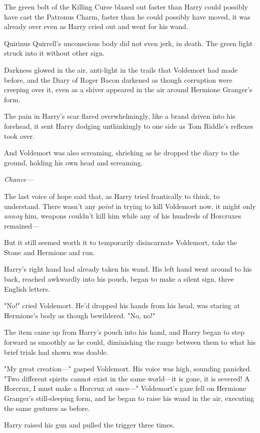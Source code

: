 The green bolt of the Killing Curse blazed out faster than Harry could possibly
have cast the Patronus Charm, faster than he could possibly have moved, it was
already over even as Harry cried out and went for his wand.

Quirinus Quirrell's unconscious body did not even jerk, in death. The green
light struck into it without other sign.

Darkness glowed in the air, anti-light in the trails that Voldemort had made
before, and the Diary of Roger Bacon darkened as though corruption were
creeping over it, even as a shiver appeared in the air around Hermione
Granger's form.

The pain in Harry's scar flared overwhelmingly, like a brand driven into his
forehead, it sent Harry dodging unthinkingly to one side as Tom Riddle's
reflexes took over.

And Voldemort was also screaming, shrieking as he dropped the diary to the
ground, holding his own head and screaming.

\emph{Chance---}

The last voice of hope said that, as Harry tried frantically to think, to
understand. There wasn't any \emph{point} in trying to kill Voldemort now, it
might only \emph{annoy} him, weapons couldn't kill him while any of his
hundreds of Horcruxes remained---

But it still seemed worth it to temporarily disincarnate Voldemort, take the
Stone and Hermione and run.

Harry's right hand had already taken his wand. His left hand went around to his
back, reached awkwardly into his pouch, began to make a silent sign, three
English letters.

"No!" cried Voldemort. He'd dropped his hands from his head, was staring at
Hermione's body as though bewildered. "No, no!"

The item came up from Harry's pouch into his hand, and Harry began to step
forward as smoothly as he could, diminishing the range between them to what his
brief trials had shown was doable.

"My great creation---" gasped Voldemort. His voice was high, sounding panicked.
"Two different spirits cannot exist in the same world---it is gone, it is
severed! A Horcrux, I must make a Horcrux at once---" Voldemort's gaze fell on
Hermione Granger's still-sleeping form, and he began to raise his wand in the
air, executing the same gestures as before.

Harry raised his gun and pulled the trigger three times.
